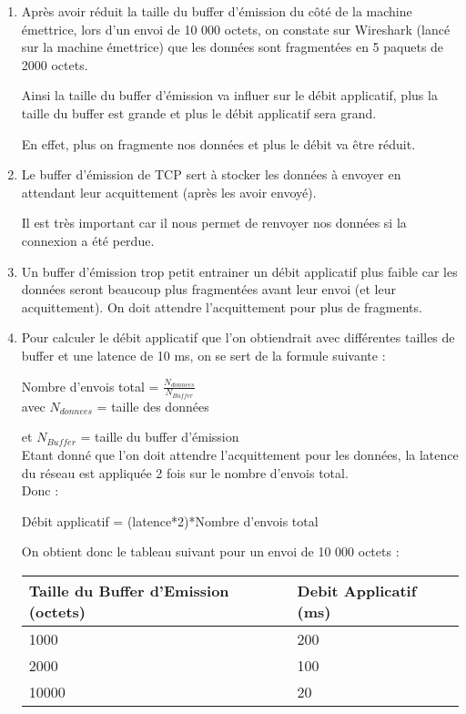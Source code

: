 \documentclass{article}
\begin{document}
\begin{enumerate}[resume]
	\item Après avoir réduit la taille du buffer d'émission du côté de la machine émettrice, lors d'un envoi de 10 000 octets, on constate sur Wireshark (lancé sur la machine émettrice) que les données sont fragmentées en 5 paquets de 2000 octets.

Ainsi la taille du buffer d'émission va influer sur le débit applicatif, plus la taille du buffer est grande et plus le débit applicatif sera grand.

En effet, plus on fragmente nos données et plus le débit va être réduit.

	\item Le buffer d'émission de TCP sert à stocker les données à envoyer en attendant leur acquittement (après les avoir envoyé).

Il est très important car il nous permet de renvoyer nos données si la connexion a été perdue.

	\item Un buffer d'émission trop petit entrainer un débit applicatif plus faible car les données seront beaucoup plus fragmentées avant leur envoi (et leur acquittement). On doit attendre l'acquittement pour plus de fragments.

	\item Pour calculer le débit applicatif que l'on obtiendrait avec différentes tailles de buffer et une latence de 10 ms, on se sert de la formule suivante :

Nombre d'envois total = $\frac{N_{donnees}}{N_{Buffer}}$\\

avec $N_{donnees}$ = taille des données

et $N_{Buffer}$ = taille du buffer d'émission\\

Etant donné que l'on doit attendre l'acquittement pour les données, la latence du réseau est appliquée 2 fois sur le nombre d'envois total.\\

Donc : 

Débit applicatif = (latence*2)*Nombre d'envois total

On obtient donc le tableau suivant pour un envoi de 10 000 octets :\\

\begin{tabular}{|p{3cm}|p{2cm}|}
\hline
Taille du Buffer d'Emission (octets) & Debit Applicatif (ms)\\
\hline
1000 & 200\\
\hline
2000 & 100\\
\hline
10000 & 20\\
\hline
\end{tabular}


\end{enumerate}
\end{document}
